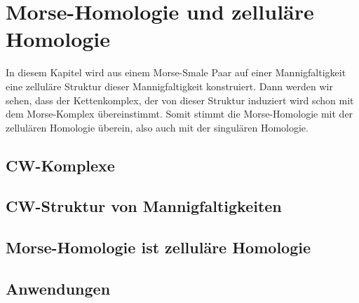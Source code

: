 \chapter{Morse-Homologie und zelluläre Homologie}

In diesem Kapitel wird aus einem Morse-Smale Paar auf einer Mannigfaltigkeit
eine zelluläre Struktur dieser Mannigfaltigkeit konstruiert. Dann werden wir 
sehen, dass der Kettenkomplex, der von dieser Struktur induziert wird schon mit
dem Morse-Komplex übereinstimmt. Somit stimmt die Morse-Homologie mit der 
zellulären Homologie überein, also auch mit der singulären Homologie.

\section{CW-Komplexe}

\section{CW-Struktur von Mannigfaltigkeiten}

\section{Morse-Homologie ist zelluläre Homologie}

\section{Anwendungen}
